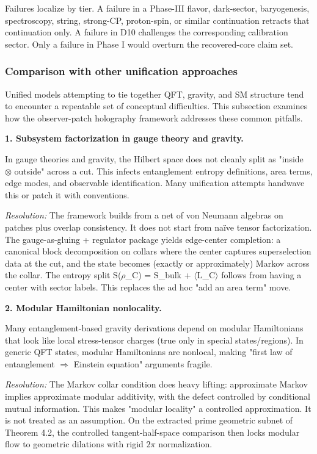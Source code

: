 Failures localize by tier. A failure in a Phase-III flavor, dark-sector, baryogenesis, spectroscopy, string, strong-CP, proton-spin, or similar continuation retracts that continuation only. A failure in D10 challenges the corresponding calibration sector. Only a failure in Phase I would overturn the recovered-core claim set.

\subsubsection{Comparison with other unification approaches}\label{85-comparison-with-other-unification-approaches}

Unified models attempting to tie together QFT, gravity, and SM structure tend to encounter a repeatable set of conceptual difficulties. This subsection examines how the observer-patch holography framework addresses these common pitfalls.

\textbf{1. Subsystem factorization in gauge theory and gravity.}

In gauge theories and gravity, the Hilbert space does not cleanly split as "inside \ensuremath{\otimes} outside" across a cut. This infects entanglement entropy definitions, area terms, edge modes, and observable identification. Many unification attempts handwave this or patch it with conventions.

\emph{Resolution:} The framework builds from a net of von Neumann algebras on patches plus overlap consistency. It does not start from na\"{i}ve tensor factorization. The gauge-as-gluing + regulator package yields edge-center completion: a canonical block decomposition on collars where the center captures superselection data at the cut, and the state becomes (exactly or approximately) Markov across the collar. The entropy split S(\ensuremath{\rho}\_C) = S\_bulk + \ensuremath{\langle}L\_C\ensuremath{\rangle} follows from having a center with sector labels. This replaces the ad hoc "add an area term" move.

\textbf{2. Modular Hamiltonian nonlocality.}

Many entanglement-based gravity derivations depend on modular Hamiltonians that look like local stress-tensor charges (true only in special states/regions). In generic QFT states, modular Hamiltonians are nonlocal, making "first law of entanglement \ensuremath{\Rightarrow} Einstein equation" arguments fragile.

\emph{Resolution:} The Markov collar condition does heavy lifting: approximate Markov implies approximate modular additivity, with the defect controlled by conditional mutual information. This makes "modular locality" a controlled approximation. It is not treated as an assumption. On the extracted prime geometric subnet of Theorem 4.2, the controlled tangent-half-space comparison then locks modular flow to geometric dilations with rigid \(2\pi\) normalization.

